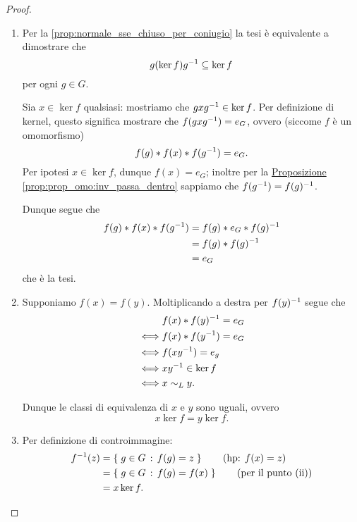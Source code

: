 \begin{proof}
    \begin{enumerate}[label={(\roman*)}]
        \item Per la \autoref{prop:normale_sse_chiuso_per_coniugio} la tesi è equivalente a dimostrare che \[
            g(\ker f) g^{-1} \subseteq \ker f   
        \] per ogni $g \in G$.
        
        Sia $x \in \ker f$ qualsiasi: mostriamo che $gxg^{-1} \in \ker f$. Per definizione di kernel, questo significa mostrare che $f(gxg^{-1}) = e_G$, ovvero (siccome $f$ è un omomorfismo) \[
            f(g) * f(x) * f(g^{-1}) = e_G.    
        \] Per ipotesi $x \in \ker f$, dunque $f(x) = e_G$; inoltre per la \hyperref[prop:prop_omo:inv_passa_dentro]{Proposizione \ref*{prop:prop_omo:inv_passa_dentro}} sappiamo che $f(g^{-1}) = f(g)^{-1}$.
        
        Dunque segue che \begin{align*}
            f(g) * f(x) * f(g^{-1}) &= f(g) * e_G * f(g)^{-1}\\
            &= f(g) * f(g)^{-1} \\
            &= e_G
        \end{align*} che è la tesi.
        \item Supponiamo $f(x) = f(y)$. Moltiplicando a destra per $f(y)^{-1}$ segue che \begin{align*}
            &f(x) * f(y)^{-1} = e_G \\
            \iff &f(x) * f(y^{-1}) = e_G \\
            \iff &f(xy^{-1}) = e_g\\
            \iff &xy^{-1} \in \ker f\\
            \iff &x \sim_L y.
        \end{align*}
        
        Dunque le classi di equivalenza di $x$ e $y$ sono uguali, ovvero \[
            x\ker f = y\ker f.    
        \]
        \item Per definizione di controimmagine: \begin{align*}
            f^{-1}(z) &= \left\{\;g \in G \,:\, f(g) = z\;\right\} \tag{hp: $f(x) = z$} \\
            &= \left\{\;g \in G \,:\, f(g) = f(x)\;\right\} \tag{per il punto (ii)}\\
            &= x\ker f. \tag*{\qedhere}
        \end{align*}
    \end{enumerate}
\end{proof}

